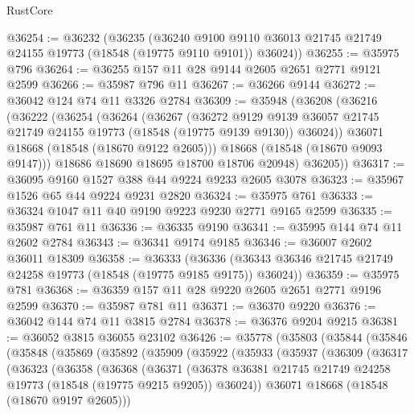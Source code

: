 \begin{lexlean}{RustCore}
\begin{coremodule}
@36254 := @36232
    (@36235
      (@36240 @9100 @9110 @36013 @21745 @21749 @24155 @19773 (@18548 (@19775 @9110 @9101)) @36024))
@36255 := @35975 @796
@36264 := @36255 @157 @11 @28 @9144 @2605 @2651 @2771 @9121 @2599
@36266 := @35987 @796 @11
@36267 := @36266 @9144
@36272 := @36042 @124 @74 @11 @3326 @2784
@36309 := @35948
    (@36208
      (@36216
        (@36222
          (@36254
            (@36264
              (@36267
                (@36272
                  @9129
                  @9139
                  @36057
                  @21745
                  @21749
                  @24155
                  @19773
                  (@18548 (@19775 @9139 @9130))
                  @36024))
              @36071
              @18668
              (@18548 (@18670 @9122 @2605)))
            @18668
            (@18548 (@18670 @9093 @9147)))
          @18686
          @18690
          @18695
          @18700
          @18706
          @20948)
        @36205))
@36317 := @36095 @9160 @1527 @388 @44 @9224 @9233 @2605 @3078
@36323 := @35967 @1526 @65 @44 @9224 @9231 @2820
@36324 := @35975 @761
@36333 := @36324 @1047 @11 @40 @9190 @9223 @9230 @2771 @9165 @2599
@36335 := @35987 @761 @11
@36336 := @36335 @9190
@36341 := @35995 @144 @74 @11 @2602 @2784
@36343 := @36341 @9174 @9185
@36346 := @36007 @2602 @36011 @18309
@36358 := @36333
    (@36336 (@36343 @36346 @21745 @21749 @24258 @19773 (@18548 (@19775 @9185 @9175)) @36024))
@36359 := @35975 @781
@36368 := @36359 @157 @11 @28 @9220 @2605 @2651 @2771 @9196 @2599
@36370 := @35987 @781 @11
@36371 := @36370 @9220
@36376 := @36042 @144 @74 @11 @3815 @2784
@36378 := @36376 @9204 @9215
@36381 := @36052 @3815 @36055 @23102
@36426 := @35778
    (@35803
      (@35844
        (@35846
          (@35848
            (@35869
              (@35892
                (@35909
                  (@35922
                    (@35933
                      (@35937
                        (@36309
                          (@36317
                            (@36323
                              (@36358
                                (@36368
                                  (@36371
                                    (@36378
                                      @36381
                                      @21745
                                      @21749
                                      @24258
                                      @19773
                                      (@18548 (@19775 @9215 @9205))
                                      @36024))
                                  @36071
                                  @18668
                                  (@18548 (@18670 @9197 @2605)))

\end{coremodule}
\end{lexlean}
